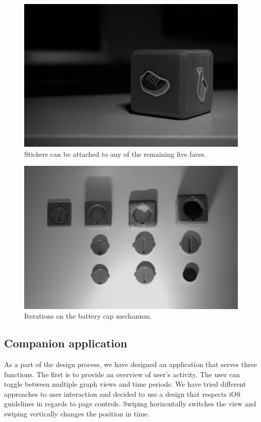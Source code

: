 \documentclass{article}
\begin{document}
\begin{figure}[H]
\centering
\includegraphics[scale=1.6]{cube_sides.jpg}
\caption{Stickers can be attached to any of the remaining five faces.}
\label{fig:stickers}
\end{figure}

\begin{figure}[H]
\centering
\includegraphics[scale=1.6]{cube_flow.jpg}
\caption{Iterations on the battery cap mechanism.}
\label{fig:history}
\end{figure}

\newpage

\subsection{Companion application}

As a part of the design process, we have designed an application that serves three functions. The first is to provide an overview of user's activity. The user can toggle between multiple graph views and time periods. We have tried different approaches to user interaction and decided to use a design that respects iOS guidelines in regards to page controls. Swiping horizontally switches the view and swiping vertically changes the position in time.\\
\end{document}
